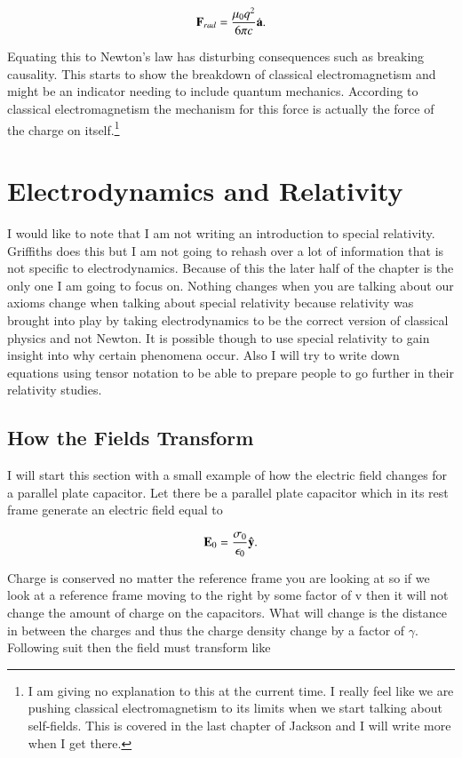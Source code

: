 \documentclass[preprint, review,12pt]{elsarticle}
\def\b{\textbf}
\newcommand{\hb}[1]{\hat{\b #1}}
\begin{document}
\begin{equation}
    \b F_{rad} = \frac{\mu_0 q^2}{6 \pi c} \dot{\b a}.
\end{equation}

Equating this to Newton's law has disturbing consequences such as breaking causality. This starts to show the breakdown of classical electromagnetism and might be an indicator needing to include quantum mechanics. According to classical electromagnetism the mechanism for this force is actually the force of the charge on itself.\footnote{I am giving no explanation to this at the current time. I really feel like we are pushing classical electromagnetism to its limits when we start talking about self-fields. This is covered in the last chapter of Jackson and I will write more when I get there.}

\section{Electrodynamics and Relativity}

I would like to note that I am not writing an introduction to special relativity. Griffiths does this but I am not going to rehash over a lot of information that is not specific to electrodynamics. Because of this the later half of the chapter is the only one I am going to focus on. Nothing changes when you are talking about our axioms change when talking about special relativity because relativity was brought into play by taking electrodynamics to be the correct version of classical physics and not Newton. It is possible though to use special relativity to gain insight into why certain phenomena occur. Also I will try to write down equations using tensor notation to be able to prepare people to go further in their relativity studies.


\subsection{How the Fields Transform}

I will start this section with a small example of how the electric field changes for a parallel plate capacitor. Let there be a parallel plate capacitor which in its rest frame generate an electric field equal to 

\begin{equation}
    \b E_0 = \frac{\sigma_0}{\epsilon_0}\hb{y}.
\end{equation}

Charge is conserved no matter the reference frame you are looking at so if we look at a reference frame moving to the right by some factor of v then it will not change the amount of charge on the capacitors. What will change is the distance in between the charges and thus the charge density change by a factor of $\gamma$. Following suit then the field must transform like
\end{document}
